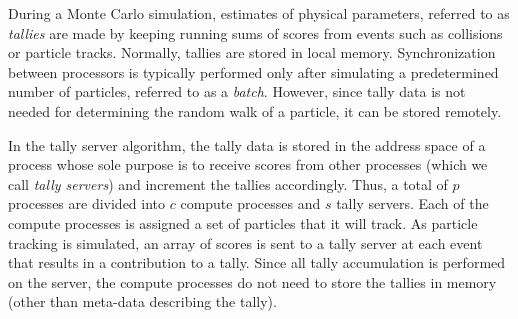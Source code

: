\documentclass{snamc2013}
\begin{document}
During a Monte Carlo simulation, estimates of physical parameters, referred to
as \emph{tallies} are made by keeping running sums of scores from events such as
collisions or particle tracks. Normally, tallies are stored in local
memory. Synchronization between processors is typically performed only after
simulating a predetermined number of particles, referred to as a
\emph{batch}. However, since tally data is not needed for determining the random
walk of a particle, it can be stored remotely.

In the tally server algorithm, the tally data is stored in the address space of
a process whose sole purpose is to receive scores from other processes (which we
call \emph{tally servers}) and increment the tallies accordingly. Thus, a total
of $p$ processes are divided into $c$ compute processes and $s$ tally
servers. Each of the compute processes is assigned a set of particles that it
will track. As particle tracking is simulated, an array of scores is sent to a
tally server at each event that results in a contribution to a tally. Since all
tally accumulation is performed on the server, the compute processes do not need
to store the tallies in memory (other than meta-data describing the tally).
\end{document}

